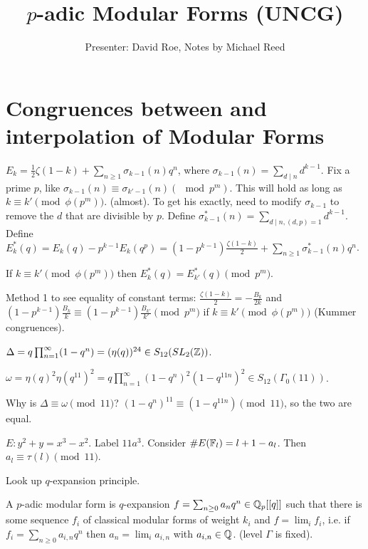 \documentclass[]{article}
\title{ $p$-adic Modular Forms (UNCG)}
\author{Presenter: David Roe, Notes by Michael Reed}
\begin{document}
\maketitle

\section*{Congruences between and interpolation of Modular Forms}

\begin{example}
	$E_k = \frac{1}{2} \zeta(1-k) + \sum_{n\geq 1} \sigma_{k-1}(n) q^n$, where $\sigma_{k-1}(n) = \sum_{d\mid n} d^{k-1}$. Fix a prime $p$, like $\sigma_{k-1}(n) \equiv \sigma_{k'-1}(n)(\mod p^m)$. This will hold as long as $k\equiv k' \pmod{\phi(p^m)}$. (almost). To get his exactly, need to modify $\sigma_{k-1}$ to remove the $d$ that are divisible by $p$.
	Define $\sigma_{k-1}^* (n) = \sum_{d\mid n,(d,p) = 1} d^{k-1}$.
	Define $E_k^*(q) = E_k(q) - p^{k-1} E_k(q^p) = (1-p^{k-1})\frac{\zeta(1-k)}{2} + \sum_{n\geq 1} \sigma_{k-1}^* (n) q^n$.
	\begin{fact}
		If $k \equiv k' \pmod{\phi(p^m)}$ then $E_k^*(q) = E_{k'}^*(q) \pmod{p^m}$.
	\end{fact}
	Method 1 to see equality of constant terms:
	$\frac{\zeta(1-k)}{2} = -\frac{B_k}{2k}$ and $(1-p^{k-1}) \frac{B_k}{k} \equiv (1-p^{k-1}) \frac{B_{k'}}{k'}\pmod{p^m}$ if $k\equiv k' \pmod{\phi(p^m)}$ (Kummer congruences).
\end{example}

$\Delta = q \prod_{n=1}^\infty (1-q^n) = (\eta(q))^{24} \in S_{12}(SL_2(\mathbb{Z}))$.

$\omega = \eta(q)^2\eta(q^{11})^2 = q\prod_{n=1}^\infty (1-q^n)^2(1-q^{11n})^2 \in S_{12}(\Gamma_0(11))$.

Why is $\Delta \equiv \omega \pmod{11}$? $(1-q^n)^11 \equiv (1-q^{11n})\pmod{11}$, so the two are equal.

\begin{remark}
	$E: y^2 + y = x^3-x^2$. Label $11a^3$. Consider $\#E(\mathbb{F}_l) = l+1-a_l$. Then $a_l \equiv \tau(l)\pmod{11}$.
\end{remark}

Look up $q$-expansion principle.

\begin{definition}
	A $p$-adic modular form is $q$-expansion $f = \sum_{n\geq 0} a_nq^n \in \mathbb{Q}_p[[q]]$ such that there is some sequence $f_i$ of classical modular forms of weight $k_i$ and $f = \lim_{i} f_i$, i.e. if $f_i = \sum_{n\geq 0} a_{i,n} q^n$ then $a_n = \lim_i a_{i,n}$ with $a_{i,n}\in\mathbb{Q}$. (level $\Gamma$ is fixed).
\end{definition}
\end{document}
